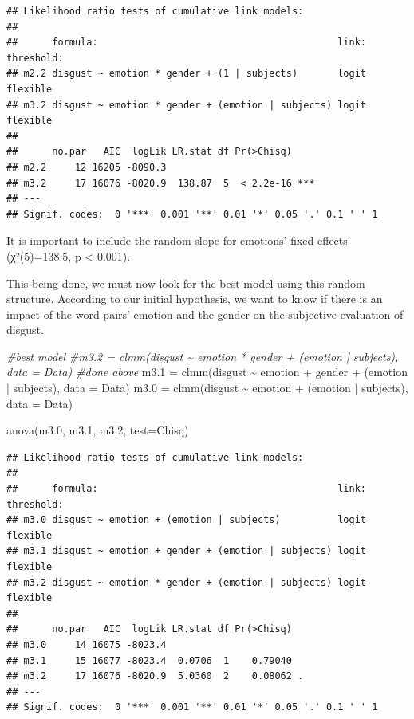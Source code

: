 \documentclass[
]{article}
\newenvironment{Shaded}{\begin{snugshade}}{\end{snugshade}}
\newcommand{\AttributeTok}[1]{\textcolor[rgb]{0.77,0.63,0.00}{#1}}
\newcommand{\CommentTok}[1]{\textcolor[rgb]{0.56,0.35,0.01}{\textit{#1}}}
\newcommand{\FloatTok}[1]{\textcolor[rgb]{0.00,0.00,0.81}{#1}}
\newcommand{\FunctionTok}[1]{\textcolor[rgb]{0.00,0.00,0.00}{#1}}
\newcommand{\NormalTok}[1]{#1}
\newcommand{\OtherTok}[1]{\textcolor[rgb]{0.56,0.35,0.01}{#1}}
\newcommand{\SpecialCharTok}[1]{\textcolor[rgb]{0.00,0.00,0.00}{#1}}
\newcommand{\StringTok}[1]{\textcolor[rgb]{0.31,0.60,0.02}{#1}}
\begin{document}
\begin{verbatim}
## Likelihood ratio tests of cumulative link models:
##  
##      formula:                                          link: threshold:
## m2.2 disgust ~ emotion * gender + (1 | subjects)       logit flexible  
## m3.2 disgust ~ emotion * gender + (emotion | subjects) logit flexible  
## 
##      no.par   AIC  logLik LR.stat df Pr(>Chisq)    
## m2.2     12 16205 -8090.3                          
## m3.2     17 16076 -8020.9  138.87  5  < 2.2e-16 ***
## ---
## Signif. codes:  0 '***' 0.001 '**' 0.01 '*' 0.05 '.' 0.1 ' ' 1
\end{verbatim}

It is important to include the random slope for emotions' fixed effects
(χ²(5)=138.5, p \textless{} 0.001).

This being done, we must now look for the best model using this random
structure. According to our initial hypothesis, we want to know if there
is an impact of the word pairs' emotion and the gender on the subjective
evaluation of disgust.

\begin{Shaded}
\begin{Highlighting}[]
\CommentTok{\#best model}
\CommentTok{\#m3.2 = clmm(disgust \textasciitilde{} emotion * gender + (emotion | subjects), data = Data) \#done above}
\NormalTok{m3}\FloatTok{.1} \OtherTok{=} \FunctionTok{clmm}\NormalTok{(disgust }\SpecialCharTok{\textasciitilde{}}\NormalTok{ emotion }\SpecialCharTok{+}\NormalTok{ gender }\SpecialCharTok{+}\NormalTok{ (emotion }\SpecialCharTok{|}\NormalTok{ subjects), }\AttributeTok{data =}\NormalTok{ Data)}
\NormalTok{m3}\FloatTok{.0} \OtherTok{=} \FunctionTok{clmm}\NormalTok{(disgust }\SpecialCharTok{\textasciitilde{}}\NormalTok{ emotion }\SpecialCharTok{+}\NormalTok{ (emotion }\SpecialCharTok{|}\NormalTok{ subjects), }\AttributeTok{data =}\NormalTok{ Data)}


\FunctionTok{anova}\NormalTok{(m3}\FloatTok{.0}\NormalTok{, m3}\FloatTok{.1}\NormalTok{, m3}\FloatTok{.2}\NormalTok{, }\AttributeTok{test=}\StringTok{\textquotesingle{}Chisq\textquotesingle{}}\NormalTok{) }
\end{Highlighting}
\end{Shaded}

\begin{verbatim}
## Likelihood ratio tests of cumulative link models:
##  
##      formula:                                          link: threshold:
## m3.0 disgust ~ emotion + (emotion | subjects)          logit flexible  
## m3.1 disgust ~ emotion + gender + (emotion | subjects) logit flexible  
## m3.2 disgust ~ emotion * gender + (emotion | subjects) logit flexible  
## 
##      no.par   AIC  logLik LR.stat df Pr(>Chisq)  
## m3.0     14 16075 -8023.4                        
## m3.1     15 16077 -8023.4  0.0706  1    0.79040  
## m3.2     17 16076 -8020.9  5.0360  2    0.08062 .
## ---
## Signif. codes:  0 '***' 0.001 '**' 0.01 '*' 0.05 '.' 0.1 ' ' 1
\end{verbatim}
\end{document}
